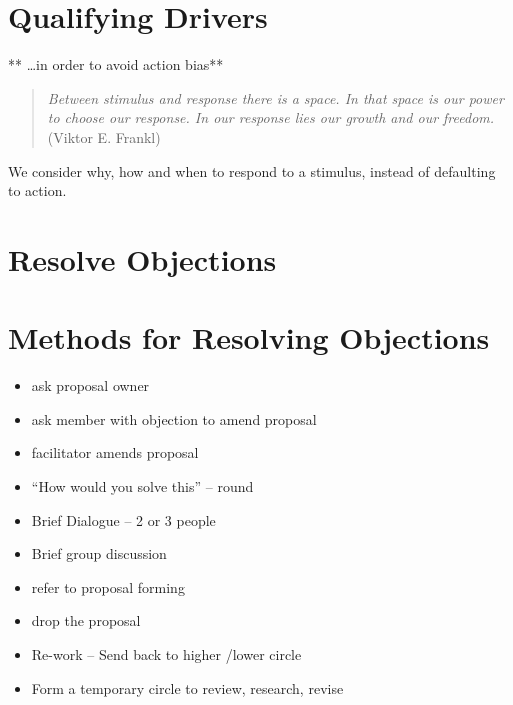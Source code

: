 \section{Qualifying Drivers}
\label{qualifyingdrivers}

** {\ldots}in order to avoid action bias**

\begin{quote}

\emph{Between stimulus and response there is a space. In that space is our power to choose our response. In our response lies our growth and our freedom.} (Viktor E. Frankl)
\end{quote}

We consider why, how and when to respond to a stimulus, instead of defaulting to action.

\section{Resolve Objections}
\label{resolveobjections}

\section{Methods for Resolving Objections}
\label{methodsforresolvingobjections}

\begin{itemize}
\item ask proposal owner

\item ask member with objection to amend proposal

\item facilitator amends proposal

\item ``How would you solve this'' – round

\item Brief Dialogue – 2 or 3 people

\item Brief group discussion

\item refer to proposal forming

\item drop the proposal

\item Re-work – Send back to higher \slash  lower circle

\item Form a temporary circle to review, research, revise

\end{itemize}

